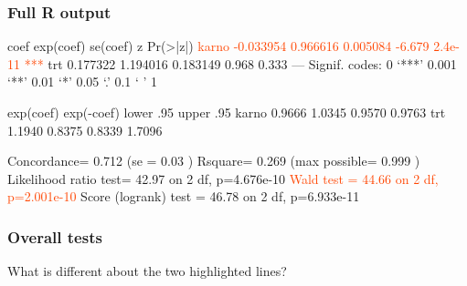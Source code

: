 \begin{frame}[fragile]
\frametitle{Full R output}
\begin{Rout}{.0}

           coef exp(coef)  se(coef)      z Pr(>|z|)
\textcolor{OrangeRed}{karno -0.033954  0.966616  0.005084 -6.679  2.4e-11 ***}
trt    0.177322  1.194016  0.183149  0.968    0.333
---
Signif. codes:  0 ‘***’ 0.001 ‘**’ 0.01 ‘*’ 0.05 ‘.’ 0.1 ‘ ’ 1

      exp(coef) exp(-coef) lower .95 upper .95
karno    0.9666     1.0345    0.9570    0.9763
trt      1.1940     0.8375    0.8339    1.7096

Concordance= 0.712  (se = 0.03 )
Rsquare= 0.269   (max possible= 0.999 )
Likelihood ratio test= 42.97  on 2 df,   p=4.676e-10
\textcolor{OrangeRed}{Wald test            = 44.66  on 2 df,   p=2.001e-10}
Score (logrank) test = 46.78  on 2 df,   p=6.933e-11
\end{Rout}
\end{frame}

\begin{frame}
\frametitle{Overall tests}
What is different about the two highlighted lines?
\vskip200pt
\end{frame}


